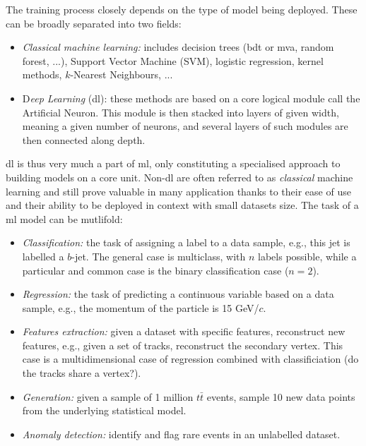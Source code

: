 The training process closely depends on the type of model being deployed. These can be broadly separated into two fields:
\begin{itemize}
    \item \textit{Classical machine learning:} includes decision trees (\gls{bdt} or \gls{mva}, random forest, ...), Support Vector Machine (SVM), logistic regression, kernel methods, $k$-Nearest Neighbours, ...
    \item D\textit{eep Learning} (\gls{dl}): these methods are based on a core logical module call the Artificial Neuron. This module is then stacked into layers of given width, meaning a given number of neurons, and several layers of such modules are then connected along depth. 
\end{itemize}
\gls{dl} is thus very much a part of \gls{ml}, only constituting a specialised approach to building models on a core unit. Non-\gls{dl} are often referred to as \textit{classical} machine learning and still prove valuable in many application thanks to their ease of use and their ability to be deployed in context with small datasets size. The task of a \gls{ml} model can be mutlifold: 
\begin{itemize}
    \item \textit{Classification:} the task of assigning a label to a data sample, e.g., this jet is labelled a $b$-jet. The general case is multiclass, with $n$ labels possible, while a particular and common case is the binary classification case ($n = 2$).
    \item \textit{Regression:} the task of predicting a continuous variable based on a data sample, e.g., the momentum of the particle is 15 GeV/$c$. 
    \item \textit{Features extraction:} given a dataset with specific features, reconstruct new features, e.g., given a set of tracks, reconstruct the secondary vertex. This case is a multidimensional case of regression combined with classificiation (do the tracks share a vertex?).
    \item \textit{Generation:} given a sample of 1 million $t\bar{t}$ events, sample 10 new data points from the underlying statistical model. 
    \item \textit{Anomaly detection:} identify and flag rare events in an unlabelled dataset.
\end{itemize}

